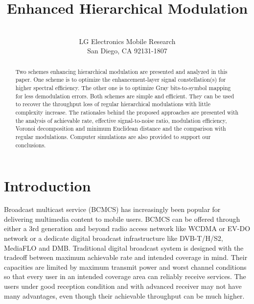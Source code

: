 \documentclass[10pt,fleqn, twocolumn]{IEEEtran}
\title{Enhanced Hierarchical Modulation}
\author{\\LG Electronics Mobile Research\\San Diego, CA 92131-1807}
\date{}
\begin{document}
\maketitle
\begin{abstract}\small
Two schemes enhancing hierarchical modulation are presented and
analyzed in this paper. One scheme is to optimize the
enhancement-layer signal constellation(s) for higher spectral
efficiency. The other one is to optimize Gray bits-to-symbol
mapping for less demodulation errors. Both schemes are simple and
efficient. They can be used to recover the throughput loss of
regular hierarchical modulations with little complexity increase.
The rationales behind the proposed approaches are presented with
the analysis of achievable rate, effective signal-to-noise ratio,
modulation efficiency, Voronoi decomposition and minimum Euclidean
distance and the comparison with regular modulations. Computer
simulations are also provided to support our conclusions.
\end{abstract}
\section{Introduction}
Broadcast multicast service (BCMCS) has increasingly been popular
for delivering multimedia content to mobile users. BCMCS can be
offered through either a 3rd generation and beyond radio access
network like WCDMA or EV-DO network or a dedicate digital
broadcast infrastructure like DVB-T/H/S2, MediaFLO and DMB.
Traditional digital broadcast system is designed with the tradeoff
between maximum achievable rate and intended coverage in mind.
Their capacities are limited by maximum transmit power and worst
channel conditions so that every user in an intended coverage area
can reliably receive services. The users under good reception
condition and with advanced receiver may not have many advantages,
even though their achievable throughput can be much higher.
\end{document}
